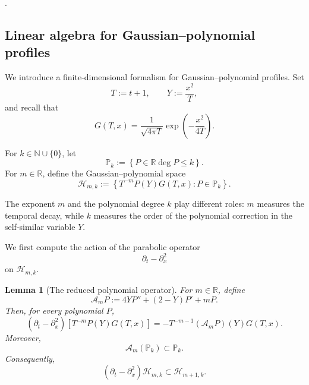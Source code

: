 \documentclass[11pt]{amsart}
\newtheorem{lemma}{Lemma}[section]
\theoremstyle{definition}
\theoremstyle{remark}
\numberwithin{equation}{section}
\newcommand{\set}[1]{\left\{#1\right\}}
\newcommand{\N}{{\mathbb N}}
\newcommand{\R}{{\mathbb R}}
\begin{document}
.

\subsection{Linear algebra for Gaussian--polynomial profiles}
\label{subsec:linear-algebra-gaussian-polynomial}

We introduce a finite-dimensional formalism for Gaussian--polynomial
profiles. Set
\[
T:=t+1,
\qquad
Y:=\frac{x^2}{T},
\]
and recall that
\[
G(T,x)
=
\frac{1}{\sqrt{4\pi T}}
\exp\left(-\frac{x^2}{4T}\right).
\]

For $k\in\N\cup\{0\}$, let
\[
\mathbb P_k
:=
\set{
P\in\R\deg P\le k
}.
\]
For $m\in\R$, define the Gaussian--polynomial space
\begin{equation}\label{eq:def-gaussian-polynomial-space}
\mathcal H_{m,k}
:=
\set{
T^{-m}P(Y)G(T,x):
P\in\mathbb P_k
}.
\end{equation}

The exponent $m$ and the polynomial degree $k$ play different roles:
$m$ measures the temporal decay, while $k$ measures the order of the
polynomial correction in the self-similar variable $Y$.

\medskip

We first compute the action of the parabolic operator
\[
\partial_t-\partial_x^2
\]
on $\mathcal H_{m,k}$.

\begin{lemma}[The reduced polynomial operator]
\label{lem:reduced-polynomial-operator}
For $m\in\R$, define
\begin{equation}\label{eq:def-Am}
\mathcal A_mP
:=
4Y P''+(2-Y)P'+mP.
\end{equation}
Then, for every polynomial $P$,
\begin{equation}\label{eq:heat-operator-gaussian-polynomial}
(\partial_t-\partial_x^2)
\left[
T^{-m}P(Y)G(T,x)
\right]
=
-T^{-m-1}
(\mathcal A_mP)(Y)G(T,x).
\end{equation}
Moreover,
\[
\mathcal A_m(\mathbb P_k)
\subset\mathbb P_k.
\]
Consequently,
\[
(\partial_t-\partial_x^2)\mathcal H_{m,k}
\subset
\mathcal H_{m+1,k}.
\]
\end{lemma}
\end{document}
